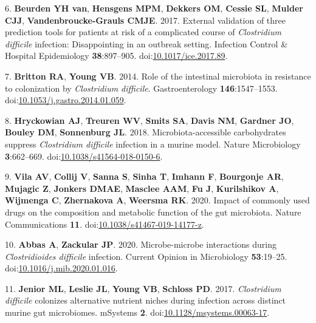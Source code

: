 \documentclass[
  12pt,
]{article}
\newenvironment{cslreferences}%
  {}%
  {\par}
\begin{document}
\begin{cslreferences}
\leavevmode\hypertarget{ref-vanBeurden2017}{}%
6. \textbf{Beurden YH van}, \textbf{Hensgens MPM}, \textbf{Dekkers OM},
\textbf{Cessie SL}, \textbf{Mulder CJJ}, \textbf{Vandenbroucke-Grauls
CMJE}. 2017. External validation of three prediction tools for patients
at risk of a complicated course of \emph{Clostridium difficile}
infection: Disappointing in an outbreak setting. Infection Control \&
Hospital Epidemiology \textbf{38}:897--905.
doi:\href{https://doi.org/10.1017/ice.2017.89}{10.1017/ice.2017.89}.

\leavevmode\hypertarget{ref-Britton2014}{}%
7. \textbf{Britton RA}, \textbf{Young VB}. 2014. Role of the intestinal
microbiota in resistance to colonization by \emph{Clostridium
difficile}. Gastroenterology \textbf{146}:1547--1553.
doi:\href{https://doi.org/10.1053/j.gastro.2014.01.059}{10.1053/j.gastro.2014.01.059}.

\leavevmode\hypertarget{ref-Hryckowian2018}{}%
8. \textbf{Hryckowian AJ}, \textbf{Treuren WV}, \textbf{Smits SA},
\textbf{Davis NM}, \textbf{Gardner JO}, \textbf{Bouley DM},
\textbf{Sonnenburg JL}. 2018. Microbiota-accessible carbohydrates
suppress \emph{Clostridium difficile} infection in a murine model.
Nature Microbiology \textbf{3}:662--669.
doi:\href{https://doi.org/10.1038/s41564-018-0150-6}{10.1038/s41564-018-0150-6}.

\leavevmode\hypertarget{ref-VichVila2020}{}%
9. \textbf{Vila AV}, \textbf{Collij V}, \textbf{Sanna S}, \textbf{Sinha
T}, \textbf{Imhann F}, \textbf{Bourgonje AR}, \textbf{Mujagic Z},
\textbf{Jonkers DMAE}, \textbf{Masclee AAM}, \textbf{Fu J},
\textbf{Kurilshikov A}, \textbf{Wijmenga C}, \textbf{Zhernakova A},
\textbf{Weersma RK}. 2020. Impact of commonly used drugs on the
composition and metabolic function of the gut microbiota. Nature
Communications \textbf{11}.
doi:\href{https://doi.org/10.1038/s41467-019-14177-z}{10.1038/s41467-019-14177-z}.

\leavevmode\hypertarget{ref-Abbas2020}{}%
10. \textbf{Abbas A}, \textbf{Zackular JP}. 2020. Microbe-microbe
interactions during \emph{Clostridioides difficile} infection. Current
Opinion in Microbiology \textbf{53}:19--25.
doi:\href{https://doi.org/10.1016/j.mib.2020.01.016}{10.1016/j.mib.2020.01.016}.

\leavevmode\hypertarget{ref-Jenior2017}{}%
11. \textbf{Jenior ML}, \textbf{Leslie JL}, \textbf{Young VB},
\textbf{Schloss PD}. 2017. \emph{Clostridium difficile} colonizes
alternative nutrient niches during infection across distinct murine gut
microbiomes. mSystems \textbf{2}.
doi:\href{https://doi.org/10.1128/msystems.00063-17}{10.1128/msystems.00063-17}.


\end{cslreferences}
\end{document}
